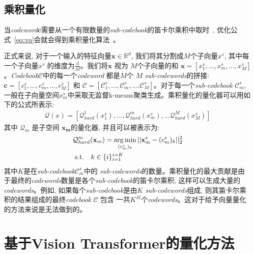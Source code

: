 \subsection{乘积量化}
当\textit{codeword}$\mathbf{c}$需要从一个有限数量的\textit{sub-codebook}的笛卡尔乘积中取时~\cite{ge2013optimized}, 优化公式~\ref{eq:vq}会就会得到乘积量化算法~\cite{jegou2010product}。\par
正式来说, 对于一个输入的特征向量$\mathbf{x} \in \mathbb{R}^d$, 我们将其分割成$M$个子向量$x^s$, 其中每一个子向量$x^s$ 的维度为$\frac{d}{M}$。我们将$\mathbf{x}$ 视为 $M$个子向量的和 $\mathbf{x} = [x^s_1,...,x^s_m,...,x^s_M]$。\textit{Codebook}$\mathcal{C}$中的每一个\textit{codeword} 都是$M$个 $M$ \textit{sub-codewords}的拼接: $\mathbf{c} = [c^s_1,...,c^s_m,...,c^s_M]$ 和  $\mathcal{C} = [\mathcal{C}^s_1,...,\mathcal{C}^s_m,....\mathcal{C}^s_M ]$。对于每一个\textit{sub-codebook} $\mathcal{C}^s_m$, 一般在子向量空间$x^s_m$中采取无监督k-means聚类生成。乘积量化的量化器可以用如下的公式所表示:
\begin{equation}
    \begin{aligned}
    \mathcal{Q}(x) = [\mathcal{Q}^1_{hard}(x^s_1),...,\mathcal{Q}^m_{hard}(x^s_m),...\mathcal{Q}^M_{hard}(x^s_M)]
    \end{aligned}
    \end{equation}
  其中 $\mathcal{Q}_m$ 是子空间 $\mathbf{x_m}$的量化器, 并且可以被表示为:
    \begin{equation}
    \label{eq:pq1}
    \begin{aligned}
    &\mathcal{Q}^m_{hard}(\mathbf{x}_m) = \operatorname*{arg\,min}_{(c^s_m)_k} ||\mathbf{x}_m^s - (c^s_m)_k ||^2_2  \\
    &\text { s.t.}  \quad k \in  \{i\}_{i=1}^{i=K}
    \end{aligned}
    \end{equation}
其中$K$是在\textit{sub-codebook}$\mathcal{C}_m^s$中的 \textit{sub-codewords}的数量。乘积量化的最大贡献是由于最终的\textit{codewords}数量是各个\textit{sub-codebook}的笛卡尔乘积, 这样可以生成大量的\textit{codewords}。例如, 如果每个\textit{sub-codebook}是由$K$ \textit{sub-codewords}组成, 则其笛卡尔乘积的结果组成的最终\textit{codebook} $\mathcal{C}$ 包含 一共$K^M$个\textit{codewords}。这对于给予向量量化的方法来说是无法做到的。
\section{基于Vision Transformer的量化方法}
